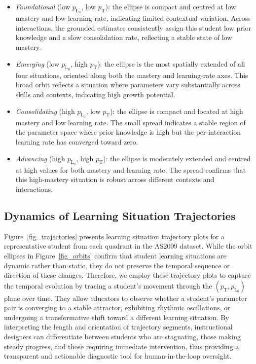 \documentclass[runningheads]{llncs}
\begin{document}
\begin{itemize}
  \item \textit{Foundational} (low $p_{\text{L}_0}$, low $p_{\text{T}}$): the ellipse is compact and centred at low mastery and low learning rate, indicating limited contextual variation. Across interactions, the grounded estimates consistently assign this student low prior knowledge and a slow consolidation rate, reflecting a stable state of low mastery.
  \item \textit{Emerging} (low $p_{\text{L}_0}$, high $p_{\text{T}}$): the ellipse is the most spatially extended of all four situations, oriented along both the mastery and learning-rate axes. This broad orbit reflects a situation where parameters vary substantially across skills and contexts, indicating high growth potential.
  \item \textit{Consolidating} (high $p_{\text{L}_0}$, low $p_{\text{T}}$): the ellipse is compact and located at high mastery and low learning rate. The small spread indicates a stable region of the parameter space where prior knowledge is high but the per-interaction learning rate has converged toward zero.
  \item \textit{Advancing} (high $p_{\text{L}_0}$, high $p_{\text{T}}$): the ellipse is moderately extended and centred at high values for both mastery and learning rate. The spread confirms that this high-mastery situation is robust across different contexts and interactions.
\end{itemize}

\subsection{Dynamics of Learning Situation Trajectories}

Figure~\ref{fig_trajectories} presents learning situation trajectory plots for a representative student from each quadrant in the AS2009 dataset. While the orbit ellipses in Figure~\ref{fig_orbits} confirm that student learning situations are dynamic rather than static, they do not preserve the temporal sequence or direction of these changes. Therefore, we employ these trajectory plots to capture the temporal evolution by tracing a student's movement through the $(p_{\text{T}}, p_{\text{L}_0})$ plane over time. They allow educators to observe whether a student's parameter pair is converging to a stable attractor, exhibiting rhythmic oscillations, or undergoing a transformative shift toward a different learning situation. By interpreting the length and orientation of trajectory segments, instructional designers can differentiate between students who are stagnating, those making steady progress, and those requiring immediate intervention, thus providing a transparent and actionable diagnostic tool for human-in-the-loop oversight. 
\end{document}

